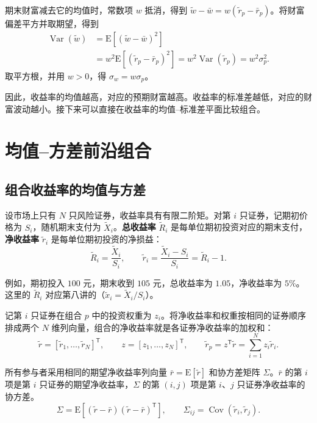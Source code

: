 期末财富减去它的均值时，常数项 $w$ 抵消，得到 $\widetilde w-\bar w=w(\widetilde r_p-\bar r_p)$。将财富偏差平方并取期望，得到
\[
 \begin{aligned}
 \operatorname{Var}(\widetilde w)
 &=\mathrm E[(\widetilde w-\bar w)^2]\\
 &=w^2\mathrm E[(\widetilde r_p-\bar r_p)^2]
 =w^2\operatorname{Var}(\widetilde r_p)
 =w^2\sigma_p^2.
 \end{aligned}
\]
取平方根，并用 $w>0$，得 $\sigma_w=w\sigma_p$。

因此，收益率的均值越高，对应的预期财富越高。收益率的标准差越低，对应的财富波动越小。接下来可以直接在收益率的均值--标准差平面比较组合。



\section{均值--方差前沿组合}\label{sec:wj-twelve-2}
\subsection{组合收益率的均值与方差}
设市场上只有 $N$ 只风险证券，收益率具有有限二阶矩。对第 $i$ 只证券，记期初价格为 $S_i$，随机期末支付为 $\widetilde X_i$。\textbf{总收益率} $\widetilde R_i$ 是每单位期初投资对应的期末支付，\textbf{净收益率} $\widetilde r_i$ 是每单位期初投资的净损益：
\[
 \widetilde R_i=\frac{\widetilde X_i}{S_i},\qquad
 \widetilde r_i=\frac{\widetilde X_i-S_i}{S_i}=\widetilde R_i-1.
\]

例如，期初投入 $100$ 元，期末收到 $105$ 元，总收益率为 $1.05$，净收益率为 $5\%$。这里的 $\widetilde R_i$ 对应第八讲的（$\tilde x_i=\widetilde X_i/S_i$）。

记第 $i$ 只证券在组合 $p$ 中的投资权重为 $z_i$。将净收益率和权重按相同的证券顺序排成两个 $N$ 维列向量，组合的净收益率就是各证券净收益率的加权和：
\[
 \widetilde r=[\widetilde r_1,\ldots,\widetilde r_N]^{\mathsf T},\qquad
 z=[z_1,\ldots,z_N]^{\mathsf T},\qquad
 \widetilde r_p=z^{\mathsf T}\widetilde r=\sum_{i=1}^N z_i\widetilde r_i.
\]

所有参与者采用相同的期望净收益率列向量 $\bar r=\mathrm E[\widetilde r]$ 和协方差矩阵 $\Sigma$。$\bar r$ 的第 $i$ 项是第 $i$ 只证券的期望净收益率，$\Sigma$ 的第 $(i,j)$ 项是第 $i$、$j$ 只证券净收益率的协方差。
\[
 \Sigma=\mathrm E[(\widetilde r-\bar r)(\widetilde r-\bar r)^{\mathsf T}],
 \qquad \Sigma_{ij}=\operatorname{Cov}(\widetilde r_i,\widetilde r_j).
\]

